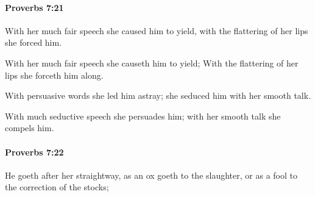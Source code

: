 		\paragraph{Proverbs 7:21} %
			\label{PROVERBS-7-21}

			With her much fair speech she caused him to yield, with the flattering of her lips she forced him.

			\begin{versebox}
					\item[BHS] 
					\item[ASV] With her much fair speech she causeth him to yield; With the flattering of her lips she forceth him along.
					\item[NIV] With persuasive words she led him astray; she seduced him with her smooth talk.
					\item[NRSV] With much seductive speech she persuades him; with her smooth talk she compels him.
			\end{versebox}

		\paragraph{Proverbs 7:22} %
			\label{PROVERBS-7-22}

			He goeth after her straightway, as an ox goeth to the slaughter, or as a fool to the correction of the stocks;

